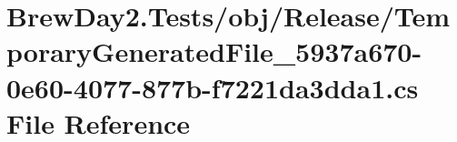 \hypertarget{_brew_day2_8_tests_2obj_2_release_2_temporary_generated_file__5937a670-0e60-4077-877b-f7221da3dda1_8cs}{}\section{Brew\+Day2.\+Tests/obj/\+Release/\+Temporary\+Generated\+File\+\_\+5937a670-\/0e60-\/4077-\/877b-\/f7221da3dda1.cs File Reference}
\label{_brew_day2_8_tests_2obj_2_release_2_temporary_generated_file__5937a670-0e60-4077-877b-f7221da3dda1_8cs}
